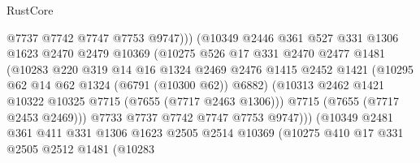 \begin{lexlean}{RustCore}
\begin{coremodule}
                                  @7737
                                  @7742
                                  @7747
                                  @7753
                                  @9747)))
                            (@10349
                              @2446
                              @361
                              @527
                              @331
                              @1306
                              @1623
                              @2470
                              @2479
                              @10369
                              (@10275
                                @526
                                @17
                                @331
                                @2470
                                @2477
                                @1481
                                (@10283
                                  @220
                                  @319
                                  @14
                                  @16
                                  @1324
                                  @2469
                                  @2476
                                  @1415
                                  @2452
                                  @1421
                                  (@10295 @62 @14 @62 @1324 (@6791 (@10300 @62)) @6882)
                                  (@10313
                                    @2462
                                    @1421
                                    @10322
                                    @10325
                                    @7715
                                    (@7655 (@7717 @2463 @1306)))
                                  @7715
                                  (@7655 (@7717 @2453 @2469)))
                                @7733
                                @7737
                                @7742
                                @7747
                                @7753
                                @9747)))
                          (@10349
                            @2481
                            @361
                            @411
                            @331
                            @1306
                            @1623
                            @2505
                            @2514
                            @10369
                            (@10275
                              @410
                              @17
                              @331
                              @2505
                              @2512
                              @1481
                              (@10283

\end{coremodule}
\end{lexlean}
